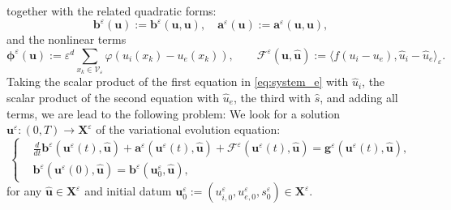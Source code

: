 \documentclass[a4paper,11pt]{article}
\theoremstyle{definition}
\numberwithin{equation}{section}
\newcommand{\e}{\varepsilon}
\newcommand{\V}{\mathcal{V}}
\begin{document}
together with the related quadratic forms:
\[
\mathbf{b}^\e(\mathbf u):= \mathbf{b}^\e(\mathbf u,\mathbf u), \quad \mathbf{a}^\e(\mathbf u):= \mathbf{a}^\e(\mathbf u,\mathbf u),
\]
and the nonlinear terms
\[
\mathbf{\phi}^\e(\mathbf u):=
\e^d\displaystyle\sum_{x_k\in\V_\e} \varphi(u_i(x_k)-u_e(x_k)),
\qquad 
\mathcal{F}^\e(\mathbf u, \widehat{\mathbf u}) := \langle f(u_i-u_e), \widehat u_i - \widehat u_e \rangle_\e.
\]
Taking the scalar product of the first equation in \eqref{eq:system_e} with $\widehat u_i$, the scalar product of the second equation with $\widehat u_e$, the third with $\widehat s$, and adding all terms, we are lead to the following problem: %
We look for a solution $\mathbf{u}^\e : (0,T) \to \mathbf{X}^\e$ of the variational evolution equation:
\begin{equation}
	\label{KNM-abstract}
	\left\{
	\begin{aligned}
		&\frac{d}{dt} \mathbf{b}^\e(\mathbf{u}^\e(t), \widehat{\mathbf{u}}) 
		+ \mathbf{a}^\e(\mathbf{u}^\e(t), \widehat{\mathbf{u}}) 
		+ 	\mathcal{F}^\e(\mathbf{u}^\e(t), \widehat{\mathbf{u}}) = \mathbf{g}^\e(\mathbf{u}^\e(t), \widehat{\mathbf{u}}), \\
		&\mathbf{b}^\e(\mathbf{u}^\e(0), \widehat{\mathbf{u}}) = \mathbf{b}^\e(\mathbf{u}_0^\e, \widehat{\mathbf{u}}),
	\end{aligned}
	\right.
\end{equation}
for any $\widehat{\mathbf{u}} \in \mathbf{X}^\e$ and initial datum $\mathbf{u}_0^\e := (u_{i,0}^\e, u_{e,0}^\e, s_0^\e)\in \mathbf{X}^\e$.
\end{document}
